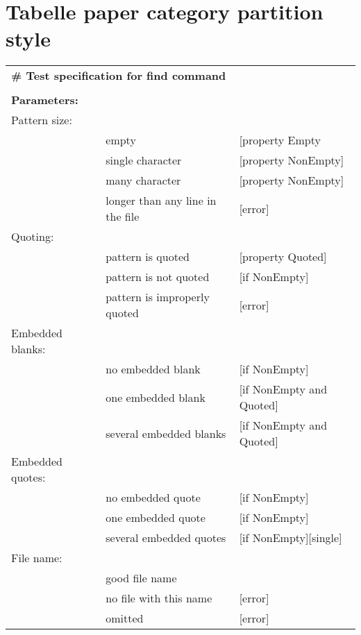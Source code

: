\clearpage
		
\section{Tabelle paper category partition style}

\begin{tabular}{lll}
\multicolumn{3}{l}{ \textbf{\# Test specification for find command} }								\\
\multicolumn{3}{l}{ }																				\\
\textbf{Parameters:}	& 										&									\\
Pattern size:			&										&									\\
						&	empty								&	[property Empty					\\
						&	single character					&	[property NonEmpty]				\\
						&	many character						&	[property NonEmpty]				\\
						&	longer than any line in the file	&	[error]							\\
Quoting:				&										&									\\
						&	pattern is quoted					&	[property Quoted]				\\
						&	pattern is not quoted				&	[if NonEmpty]					\\
						&	pattern is improperly quoted		&	[error]							\\
Embedded blanks:		&										&									\\
						&	no embedded blank					&	[if NonEmpty]					\\
						&	one embedded blank					&	[if NonEmpty and Quoted]		\\
						&	several embedded blanks				&	[if NonEmpty and Quoted]		\\
Embedded quotes:		&										&									\\
						&	no embedded quote					&	[if NonEmpty]					\\
						&	one embedded quote					&	[if NonEmpty]					\\
						&	several embedded quotes				&	[if NonEmpty][single]			\\
File name:				&										&									\\
						&	good file name						&									\\
						&	no file with this name				&	[error]							\\
						&	omitted								&	[error]							\\
\end{tabular}

